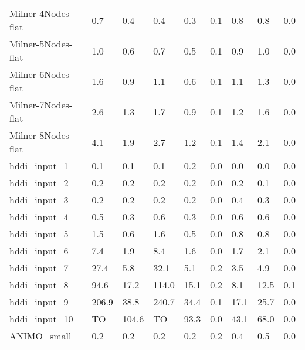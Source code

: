 \begin{table}
\begin{adjustbox}{max totalheight=\textheight}
\begin{tabular}{|l|llllllll|}
    Milner-4Nodes-flat & 0.7      & 0.4      & 0.4      & 0.3      & 0.1      & 0.8      & 0.8      & 0.0    \\
    Milner-5Nodes-flat & 1.0      & 0.6      & 0.7      & 0.5      & 0.1      & 0.9      & 1.0      & 0.0    \\
    Milner-6Nodes-flat & 1.6      & 0.9      & 1.1      & 0.6      & 0.1      & 1.1      & 1.3      & 0.0    \\
    Milner-7Nodes-flat & 2.6      & 1.3      & 1.7      & 0.9      & 0.1      & 1.2      & 1.6      & 0.0    \\
    Milner-8Nodes-flat & 4.1      & 1.9      & 2.7      & 1.2      & 0.1      & 1.4      & 2.1      & 0.0    \\ \hline
    hddi\_input\_1     & 0.1      & 0.1      & 0.1      & 0.2      & 0.0      & 0.0      & 0.0      & 0.0    \\
    hddi\_input\_2     & 0.2      & 0.2      & 0.2      & 0.2      & 0.0      & 0.2      & 0.1      & 0.0    \\
    hddi\_input\_3     & 0.2      & 0.2      & 0.2      & 0.2      & 0.0      & 0.4      & 0.3      & 0.0    \\
    hddi\_input\_4     & 0.5      & 0.3      & 0.6      & 0.3      & 0.0      & 0.6      & 0.6      & 0.0    \\
    hddi\_input\_5     & 1.5      & 0.6      & 1.6      & 0.5      & 0.0      & 0.8      & 0.8      & 0.0    \\
    hddi\_input\_6     & 7.4      & 1.9      & 8.4      & 1.6      & 0.0      & 1.7      & 2.1      & 0.0    \\
    hddi\_input\_7     & 27.4     & 5.8      & 32.1     & 5.1      & 0.2      & 3.5      & 4.9      & 0.0    \\
    hddi\_input\_8     & 94.6     & 17.2     & 114.0    & 15.1     & 0.2      & 8.1      & 12.5     & 0.1    \\
    hddi\_input\_9     & 206.9    & 38.8     & 240.7    & 34.4     & 0.1      & 17.1     & 25.7     & 0.0    \\
    hddi\_input\_10    & TO       & 104.6    & TO       & 93.3     & 0.0      & 43.1     & 68.0     & 0.0    \\ \hline
    ANIMO\_small       & 0.2      & 0.2      & 0.2      & 0.2      & 0.2      & 0.4      & 0.5      & 0.0    \\ \hline
    \end{tabular}
\end{adjustbox}
\end{table}



